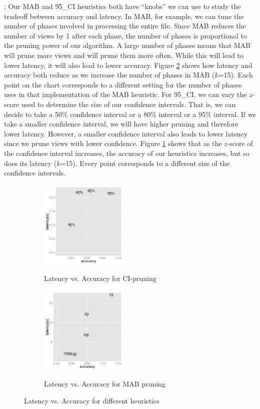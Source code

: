 :
Our MAB and 95\_CI heuristics both have ``knobs'' we can use to study the
tradeoff between accuracy and latency.
In MAB, for example, we can tune the number of phases involved in
processing the entire file. 
Since MAB reduces the number of views by 1 after each phase, the number of
phases is proportional to the pruning power of our algorithm.
A large number of phases means that MAB will prune more views and will prune
them more often.
While this will lead to lower latency, it will also lead to lower accuracy.
Figure \ref{fig:latency_vs_accuracy_mab} shows how latency and accuracy both
reduce as we increase the number of phases in MAB ($k$=15).
Each point on the chart corresponds to a different setting for the number of
phases uses in that implementation of the MAB heuristic.
For 95\_CI, we can vary the $z$-score used
to determine the size of our confidence intervals.
That is, we can decide to take a 50\% confidence interval or a 80\% interval or
a 95\% interval.
If we take a smaller confidence interval, we will have higher pruning and
therefore lower latency.
However, a smaller confidence interval also leads to lower latency since we
prune views with lower confidence.
Figure \ref{fig:latency_vs_accuracy_ci} shows that as the $z$-score of the
confidence interval increases, the accuracy of our heuristics increases, but so
does its latency ($k$=15).
Every point corresponds to a different size of the confidence intervals.

\begin{figure}[h] 
\centering
\begin{subfigure}{0.49\linewidth}
\centering
{\includegraphics[width=4.2cm] {Images/latency_vs_accuracy_ci.pdf}}
\caption{Latency vs. Accuracy for CI-pruning}
\label{fig:latency_vs_accuracy_ci}
\end{subfigure}
\begin{subfigure}{0.49\linewidth}
\centering
{\includegraphics[width=4.2cm] {Images/latency_vs_accuracy_mab.pdf}}
\caption{Latency vs. Accuracy for MAB pruning}
\label{fig:latency_vs_accuracy_mab}
\end{subfigure}
\label{fig:accuracy}
\caption{Latency vs. Accuracy for different heuristics }
\end{figure}

